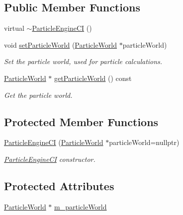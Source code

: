 \subsection*{Public Member Functions}
\begin{DoxyCompactItemize}
\item 
virtual \mbox{\hyperlink{classr3_1_1_particle_engine_c_i_ab94f2e07fe82865bdf3845db7c47df0d}{$\sim$\+Particle\+Engine\+CI}} ()
\item 
void \mbox{\hyperlink{classr3_1_1_particle_engine_c_i_ac3e59efbd738a6cf8195f5377cc4752c}{set\+Particle\+World}} (\mbox{\hyperlink{classr3_1_1_particle_world}{Particle\+World}} $\ast$particle\+World)
\begin{DoxyCompactList}\small\item\em Set the particle world, used for particle calculations. \end{DoxyCompactList}\item 
\mbox{\hyperlink{classr3_1_1_particle_world}{Particle\+World}} $\ast$ \mbox{\hyperlink{classr3_1_1_particle_engine_c_i_af622bfe4b9279ffd5dcff14d43a8887b}{get\+Particle\+World}} () const
\begin{DoxyCompactList}\small\item\em Get the particle world. \end{DoxyCompactList}\end{DoxyCompactItemize}
\subsection*{Protected Member Functions}
\begin{DoxyCompactItemize}
\item 
\mbox{\hyperlink{classr3_1_1_particle_engine_c_i_aed45db6981645c4b1f4b8660e86ef7cc}{Particle\+Engine\+CI}} (\mbox{\hyperlink{classr3_1_1_particle_world}{Particle\+World}} $\ast$particle\+World=nullptr)
\begin{DoxyCompactList}\small\item\em \mbox{\hyperlink{classr3_1_1_particle_engine_c_i}{Particle\+Engine\+CI}} constructor. \end{DoxyCompactList}\end{DoxyCompactItemize}
\subsection*{Protected Attributes}
\begin{DoxyCompactItemize}
\item 
\mbox{\hyperlink{classr3_1_1_particle_world}{Particle\+World}} $\ast$ \mbox{\hyperlink{classr3_1_1_particle_engine_c_i_ad13321df475d526a7a2ed34e46cc10ee}{m\+\_\+particle\+World}}
\end{DoxyCompactItemize}


